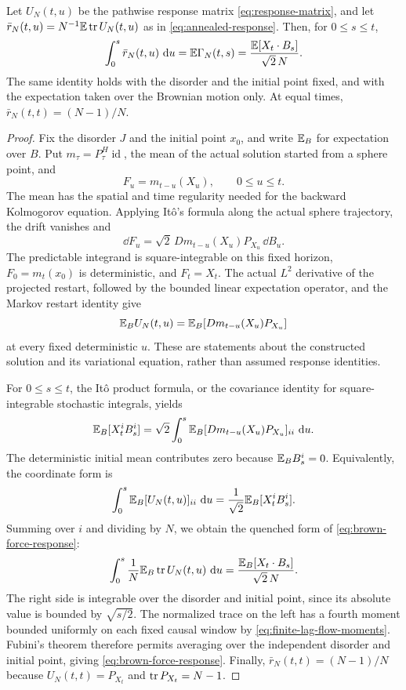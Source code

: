\begin{lemma}\label{lem:brown-force-response}
Let $U_N(t,u)$ be the pathwise response matrix \eqref{eq:response-matrix}, and let $\bar r_N(t,u)=N^{-1}\mathbb E\operatorname{tr} U_N(t,u)$ as in \eqref{eq:annealed-response}. Then, for $0\le s\le t$,
\begin{equation}
 \int_0^s\bar r_N(t,u)\,\mathop{}\!\mathrm d u
 =\mathbb E\Gamma_N(t,s)
 =\frac{\mathbb E[X_t\cdot B_s]}{\sqrt2\,N}.
\label{eq:brown-force-response}
\end{equation}
The same identity holds with the disorder and the initial point fixed, and with the expectation taken over the Brownian motion only. At equal times, $\bar r_N(t,t)=(N-1)/N$.
\end{lemma}

\begin{proof}
Fix the disorder $J$ and the initial point $x_0$, and write $\mathbb E_B$ for expectation over $B$. Put $m_\tau=P^H_\tau\operatorname{id}$, the mean of the actual solution started from a sphere point, and
\[
 F_u=m_{t-u}(X_u),\qquad 0\le u\le t.
\]
The mean has the spatial and time regularity needed for the backward Kolmogorov equation. Applying It\^o's formula along the actual sphere trajectory, the drift vanishes and
\[
 \dd F_u=\sqrt2\,Dm_{t-u}(X_u)P_{X_u}\,\dd B_u.
\]
The predictable integrand is square-integrable on this fixed horizon, $F_0=m_t(x_0)$ is deterministic, and $F_t=X_t$. The actual $L^2$ derivative of the projected restart, followed by the bounded linear expectation operator, and the Markov restart identity give
\[
 \mathbb E_BU_N(t,u)=\mathbb E_B[Dm_{t-u}(X_u)P_{X_u}]
\]
at every fixed deterministic $u$. These are statements about the constructed solution and its variational equation, rather than assumed response identities.

For $0\le s\le t$, the It\^o product formula, or the covariance identity for square-integrable stochastic integrals, yields
\[
 \mathbb E_B[X_t^iB_s^i]
 =\sqrt2\int_0^s\mathbb E_B[Dm_{t-u}(X_u)P_{X_u}]_{ii}\,\mathop{}\!\mathrm d u.
\]
The deterministic initial mean contributes zero because $\mathbb E_BB_s^i=0$. Equivalently, the coordinate form is
\begin{equation}\label{eq:cameron-martin-derivative}
 \int_0^s\mathbb E_B[U_N(t,u)]_{ii}\,\mathop{}\!\mathrm d u
 =\frac1{\sqrt2}\mathbb E_B[X_t^iB_s^i].
\end{equation}
Summing over $i$ and dividing by $N$, we obtain the quenched form of \eqref{eq:brown-force-response}:
\begin{equation}\label{eq:quenched-brown-force-response}
 \int_0^s\frac1N\mathbb E_B\operatorname{tr} U_N(t,u)\,\mathop{}\!\mathrm d u
 =\frac{\mathbb E_B[X_t\cdot B_s]}{\sqrt2\,N}.
\end{equation}
The right side is integrable over the disorder and initial point, since its absolute value is bounded by $\sqrt{s/2}$. The normalized trace on the left has a fourth moment bounded uniformly on each fixed causal window by \eqref{eq:finite-lag-flow-moments}. Fubini's theorem therefore permits averaging over the independent disorder and initial point, giving \eqref{eq:brown-force-response}. Finally, $\bar r_N(t,t)=(N-1)/N$ because $U_N(t,t)=P_{X_t}$ and $\operatorname{tr} P_{X_t}=N-1$.
\end{proof}

